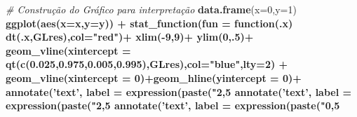 \documentclass[
]{book}
\newenvironment{Shaded}{\begin{snugshade}}{\end{snugshade}}
\newcommand{\CommentTok}[1]{\textcolor[rgb]{0.56,0.35,0.01}{\textit{#1}}}
\newcommand{\ControlFlowTok}[1]{\textcolor[rgb]{0.13,0.29,0.53}{\textbf{#1}}}
\newcommand{\DataTypeTok}[1]{\textcolor[rgb]{0.13,0.29,0.53}{#1}}
\newcommand{\DecValTok}[1]{\textcolor[rgb]{0.00,0.00,0.81}{#1}}
\newcommand{\FloatTok}[1]{\textcolor[rgb]{0.00,0.00,0.81}{#1}}
\newcommand{\KeywordTok}[1]{\textcolor[rgb]{0.13,0.29,0.53}{\textbf{#1}}}
\newcommand{\NormalTok}[1]{#1}
\newcommand{\OperatorTok}[1]{\textcolor[rgb]{0.81,0.36,0.00}{\textbf{#1}}}
\newcommand{\StringTok}[1]{\textcolor[rgb]{0.31,0.60,0.02}{#1}}
\begin{document}
\begin{Shaded}
\begin{Highlighting}[]
\CommentTok{# Construção do Gráfico para interpretação}
\KeywordTok{data.frame}\NormalTok{(}\DataTypeTok{x=}\DecValTok{0}\NormalTok{,}\DataTypeTok{y=}\DecValTok{1}\NormalTok{) }\OperatorTok{%
\StringTok{  }\KeywordTok{ggplot}\NormalTok{(}\KeywordTok{aes}\NormalTok{(}\DataTypeTok{x=}\NormalTok{x,}\DataTypeTok{y=}\NormalTok{y)) }\OperatorTok{+}\StringTok{ }
\StringTok{  }\KeywordTok{stat_function}\NormalTok{(}\DataTypeTok{fun =} \ControlFlowTok{function}\NormalTok{(.x) }\KeywordTok{dt}\NormalTok{(.x,GLres),}\DataTypeTok{col=}\StringTok{"red"}\NormalTok{)}\OperatorTok{+}
\StringTok{  }\KeywordTok{xlim}\NormalTok{(}\OperatorTok{-}\DecValTok{9}\NormalTok{,}\DecValTok{9}\NormalTok{)}\OperatorTok{+}\StringTok{ }\KeywordTok{ylim}\NormalTok{(}\DecValTok{0}\NormalTok{,.}\DecValTok{5}\NormalTok{)}\OperatorTok{+}
\StringTok{  }\KeywordTok{geom_vline}\NormalTok{(}\DataTypeTok{xintercept =} \KeywordTok{qt}\NormalTok{(}\KeywordTok{c}\NormalTok{(}\FloatTok{0.025}\NormalTok{,}\FloatTok{0.975}\NormalTok{,}\FloatTok{0.005}\NormalTok{,}\FloatTok{0.995}\NormalTok{),GLres),}\DataTypeTok{col=}\StringTok{"blue"}\NormalTok{,}\DataTypeTok{lty=}\DecValTok{2}\NormalTok{) }\OperatorTok{+}
\StringTok{  }\KeywordTok{geom_vline}\NormalTok{(}\DataTypeTok{xintercept =} \DecValTok{0}\NormalTok{)}\OperatorTok{+}\KeywordTok{geom_hline}\NormalTok{(}\DataTypeTok{yintercept =} \DecValTok{0}\NormalTok{)}\OperatorTok{+}
\StringTok{  }\KeywordTok{annotate}\NormalTok{(}\StringTok{'text'}\NormalTok{, }\DataTypeTok{label =} \KeywordTok{expression}\NormalTok{(}\KeywordTok{paste}\NormalTok{(}\StringTok{"2,5%
\StringTok{  }\KeywordTok{annotate}\NormalTok{(}\StringTok{'text'}\NormalTok{, }\DataTypeTok{label =} \KeywordTok{expression}\NormalTok{(}\KeywordTok{paste}\NormalTok{(}\StringTok{"2,5%
\StringTok{  }\KeywordTok{annotate}\NormalTok{(}\StringTok{'text'}\NormalTok{, }\DataTypeTok{label =} \KeywordTok{expression}\NormalTok{(}\KeywordTok{paste}\NormalTok{(}\StringTok{"0,5%
}}}}
\end{Highlighting}
\end{Shaded}
\end{document}

